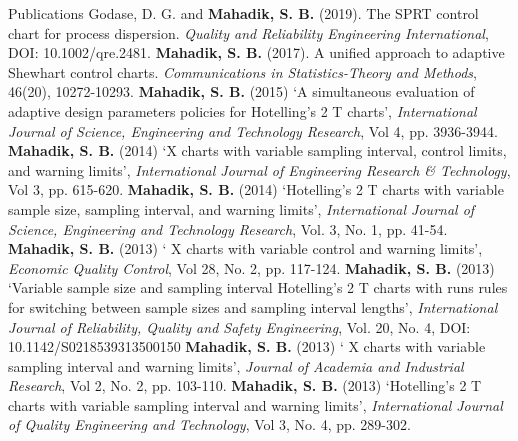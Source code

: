 \begin{rubric}{\color{Maroon}Publications}
\entry*[] Godase, D. G. and \textbf{\color{Maroon}Mahadik, S. B.} (2019). The SPRT control chart for process dispersion. \textit{Quality and Reliability Engineering International}, DOI: 10.1002/qre.2481.
\vspace{0.12cm}
%
\entry*[]  \textbf{\color{Maroon}Mahadik, S. B.} (2017). A unified approach to adaptive Shewhart control charts. \textit{Communications in Statistics-Theory and Methods}, 46(20), 10272-10293.
\vspace{0.12cm}
%
\entry*[]  \textbf{\color{Maroon}Mahadik, S. B.} (2015) ‘A simultaneous evaluation of adaptive design
parameters policies for Hotelling’s 2 T charts’, \textit{International Journal of Science, Engineering and Technology Research}, Vol 4, pp. 3936-3944.
\vspace{0.12cm}
%
\entry*[]  \textbf{\color{Maroon}Mahadik, S. B.} (2014) ‘X charts with variable sampling interval, control limits, and warning limits’, \textit{International Journal of Engineering Research \& Technology}, Vol 3, pp. 615-620.
\vspace{0.12cm}
%
\entry*[] \textbf{\color{Maroon}Mahadik, S. B.} (2014) ‘Hotelling’s 2 T charts with variable sample size, sampling interval, and warning limits’, \textit{International Journal of Science, Engineering and Technology Research}, Vol. 3, No. 1, pp. 41-54.
\vspace{0.12cm}
%
\entry*[] \textbf{\color{Maroon}Mahadik, S. B.} (2013) ‘ X charts with variable control and warning limits’, \textit{Economic Quality Control}, Vol 28, No. 2, pp. 117-124.
\vspace{0.12cm}
%
\entry*[] \textbf{\color{Maroon}Mahadik, S. B.} (2013) ‘Variable sample size and sampling interval Hotelling’s 2 T charts with runs rules for switching between sample
sizes and sampling interval lengths’, \textit{International Journal of
	Reliability, Quality and Safety Engineering}, Vol. 20, No. 4, DOI:
10.1142/S0218539313500150
\vspace{0.12cm}
%
\entry*[] \textbf{\color{Maroon}Mahadik, S. B.} (2013) ‘ X charts with variable sampling interval and warning limits’, \textit{Journal of Academia and Industrial Research}, Vol 2,
No. 2, pp. 103-110.
%
\entry*[] \textbf{\color{Maroon}Mahadik, S. B.} (2013) ‘Hotelling’s 2 T charts with variable sampling interval and warning limits’, \textit{International Journal of Quality
	Engineering and Technology}, Vol 3, No. 4, pp. 289-302.	
\vspace{0.12cm}

\end{rubric}
